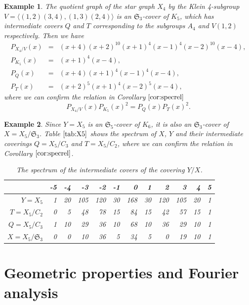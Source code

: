\documentclass[lualatex,12pt]{article}
\newtheorem{exm}{Example}
\begin{document}
\begin{exm}
 The quotient graph of the star graph $X_4$ by the Klein 4-subgroup
 $V=\langle(1,2)(3,4), (1,3)(2,4)\rangle$ is an ${\mathfrak S}_3$-cover of $K_5$,
 which has intermediate covers $Q$ and $T$ corresponding to
 the subgroups $A_4$ and $V(1,2)$ respectively.
 Then we have
\begin{eqnarray*}
 P_{X_4/V}(x) & = &(x+4)(x+2)^{10}(x+1)^4(x-1)^4(x-2)^{10}(x-4),\\
 P_{K_5}(x) & = &(x+1)^4(x-4), \\
 P_{Q}(x) & = & (x+4)(x+1)^4(x-1)^4(x-4),\\
 P_{T}(x) & = &(x+2)^5(x+1)^4(x-2)^5(x-4),
\end{eqnarray*}
where we can confirm the relation in Corollary $\ref{cor:specrel}$
\[
 P_{X_4/V}(x)P_{K_5}(x)^2 = P_Q(x) P_T(x)^2.
\]
\end{exm}

\begin{exm}
 Since $Y=X_5$ is an ${\mathfrak S}_5$-cover of $K_6$,
 it is also an ${\mathfrak S}_3$-cover of
 $X=X_5/{\mathfrak S}_3$. 
 Table $\ref{tab:X5}$ shows the
 spectrum of $X$, $Y$ and their intermediate
 coverings $Q=X_5/C_3$ and $T=X_5/C_2$,
 where we can confirm the relation  in Corollary $\ref{cor:specrel}$.
\begin{table}[ht]
\centering
\begin{tabular}{r||r|r|r|r|r|r|r|r|r|r|r}
 & -5 & -4 & -3 & -2 & -1 & 0 & 1 & 2 & 3 & 4 & 5 \\ 
  \hline
 $Y=X_5$ &   1 &  20 & 105 & 120 &  30 & 168 &  30 & 120 & 105 &  20 &   1 \\ 
 $T=X_5/C_2$ &   0 &   5 &  48 &  78 &  15 &  84 &  15 &  42 &  57 &  15 &   1 \\ 
 $Q=X_5/C_3$ &   1 &  10 &  29 &  36 &  10 &  68 &  10 &  36 &  29 &  10 &   1 \\ 
 $X=X_5/{\mathfrak S}_3$ &   0 &   0 &  10 &  36 &   5 &  34 &   5 &   0 &  19 &  10 &   1 \\ 
\end{tabular}
 \caption{The spectrum of the intermediate covers of the covering $Y/X$.}
 \label{tab:X5}
\end{table}
 
\end{exm}


\section{Geometric properties and Fourier analysis}
\end{document}
